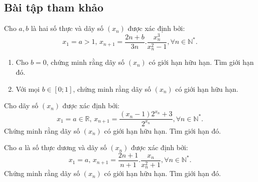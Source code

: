 \subsection{Bài tập tham khảo}

\begin{bt}
Cho $a,b$ là hai số thực và dãy số $(x_n)$ được xác định bởi: $$x_1=a >1,\, x_{n+1}=\dfrac{2n+b}{3n}.\dfrac{x_{n}^3}{x_{n}^2-1},\forall n\in\mathbb{N^*}.$$
\begin{enumerate}
	\item Cho $b=0$, chứng minh rằng dãy số $(x_n)$ có giới hạn hữu hạn. Tìm giới hạn đó.
	\item Với mọi $b \in [0;1]$, chứng minh rằng dãy số $(x_n)$ có giới hạn hữu hạn.
\end{enumerate}
\end{bt}

\begin{bt}
Cho dãy số $(x_n)$ được xác định bởi: $$x_1=a \in \mathbb{R},\, x_{n+1}=\dfrac{(x_n-1)2^{x_n}+3}{2^{x_n}},\forall n\in\mathbb{N^*}.$$
Chứng minh rằng dãy số $(x_n)$ có giới hạn hữu hạn. Tìm giới hạn đó.
\end{bt}

\begin{bt}
Cho $a$ là số thực dương và dãy số $(x_n)$ được xác định bởi: $$x_1=a,\, x_{n+1}=\dfrac{2n+1}{n+1}.\dfrac{x_{n}}{x_{n}^2+1},\forall n\in\mathbb{N^*}.$$ Chứng minh rằng dãy số $(x_n)$ có giới hạn hữu hạn. Tìm giới hạn đó.
\end{bt}

